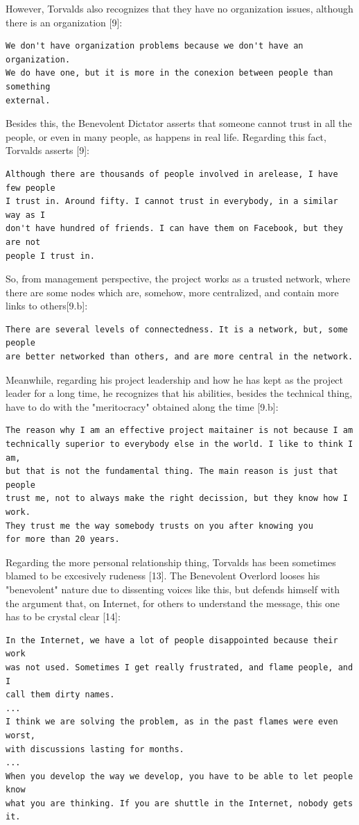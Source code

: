 \documentclass[11pt]{article}
\begin{document}
However, Torvalds also recognizes that they have no organization issues, although there is an organization [9]:
\begin{verbatim}
We don't have organization problems because we don't have an organization.
We do have one, but it is more in the conexion between people than something 
external.
\end{verbatim}
Besides this, the Benevolent Dictator asserts that someone cannot trust in all the people, or even in many people, as happens in real life. Regarding this fact, Torvalds asserts [9]:
\begin{verbatim}
Although there are thousands of people involved in arelease, I have few people 
I trust in. Around fifty. I cannot trust in everybody, in a similar way as I 
don't have hundred of friends. I can have them on Facebook, but they are not
people I trust in.
\end{verbatim}
So, from management perspective, the project works as a trusted network, where there are some nodes which are, somehow, more centralized, and contain more links to others[9.b]:
\begin{verbatim}
There are several levels of connectedness. It is a network, but, some people 
are better networked than others, and are more central in the network.
\end{verbatim}
Meanwhile, regarding his project leadership and how he has kept as the project leader for a long time, he recognizes that his abilities, besides the technical thing, have to do with the "meritocracy" obtained along the time [9.b]:
\begin{verbatim}
The reason why I am an effective project maitainer is not because I am 
technically superior to everybody else in the world. I like to think I am, 
but that is not the fundamental thing. The main reason is just that people 
trust me, not to always make the right decission, but they know how I work. 
They trust me the way somebody trusts on you after knowing you
for more than 20 years.
\end{verbatim}
Regarding the more personal relationship thing, Torvalds has been sometimes blamed to be excesively rudeness [13]. The Benevolent Overlord looses his "benevolent" nature due to dissenting voices like this, but defends himself with the argument that, on Internet, for others to understand the message, this one has to be crystal clear [14]:
\begin{verbatim}
In the Internet, we have a lot of people disappointed because their work 
was not used. Sometimes I get really frustrated, and flame people, and I 
call them dirty names.
...
I think we are solving the problem, as in the past flames were even worst, 
with discussions lasting for months.
...
When you develop the way we develop, you have to be able to let people know 
what you are thinking. If you are shuttle in the Internet, nobody gets it.
\end{verbatim}
\end{document}
